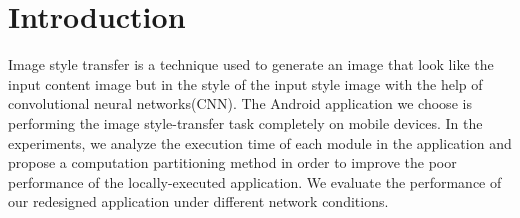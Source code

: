 \documentclass[a4paper,12pt,onecolumn,twoside]{article}
\begin{document}
\begin{CJK*}{GBK}{song}
\begin{center}
{%
}
\end{center}
\setlength{\oddsidemargin}{-.5cm}  %
\setlength{\evensidemargin}{\oddsidemargin}
\setlength{\textwidth}{17.00cm}
\section{Introduction}
Image style transfer\cite{1508.06576} is a technique used to generate an image
that look like the input content image but in the style of the input
style image with the help of convolutional neural networks(CNN).
The Android application we choose is performing the image 
style-transfer task completely on mobile devices. In the experiments,
we analyze the execution time of each module in the application and 
propose a computation partitioning method in order to improve the 
poor performance of the locally-executed application. We evaluate the
performance of our redesigned application under different network 
conditions.


\end{CJK*}
\end{document}
